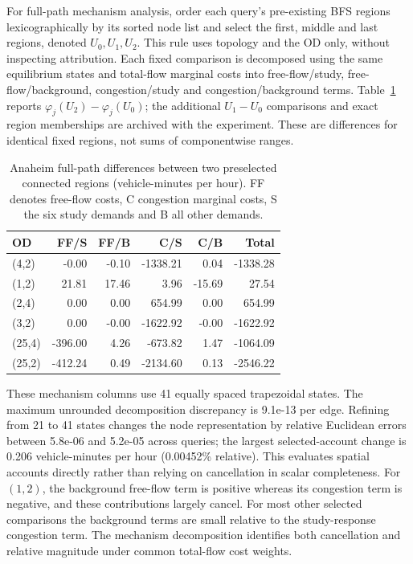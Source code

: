 For full-path mechanism analysis, order each query's pre-existing BFS regions lexicographically by its sorted node list and select the first, middle and last regions, denoted $U_0,U_1,U_2$. This rule uses topology and the OD only, without inspecting attribution. Each fixed comparison is decomposed using the same equilibrium states and total-flow marginal costs into free-flow/study, free-flow/background, congestion/study and congestion/background terms. Table~\ref{tab:anaheimmechanism} reports $\varphi_j(U_2)-\varphi_j(U_0)$; the additional $U_1-U_0$ comparisons and exact region memberships are archived with the experiment. These are differences for identical fixed regions, not sums of componentwise ranges.
\begin{table}[t]\centering\small
\caption{Anaheim full-path differences between two preselected connected regions (vehicle-minutes per hour). FF denotes free-flow costs, C congestion marginal costs, S the six study demands and B all other demands.}\label{tab:anaheimmechanism}
\begin{tabular}{lrrrrr}\toprule OD & FF/S & FF/B & C/S & C/B & Total\\\midrule
(4,2) & -0.00 & -0.10 & -1338.21 & 0.04 & -1338.28\\
(1,2) & 21.81 & 17.46 & 3.96 & -15.69 & 27.54\\
(2,4) & 0.00 & 0.00 & 654.99 & 0.00 & 654.99\\
(3,2) & 0.00 & -0.00 & -1622.92 & -0.00 & -1622.92\\
(25,4) & -396.00 & 4.26 & -673.82 & 1.47 & -1064.09\\
(25,2) & -412.24 & 0.49 & -2134.60 & 0.13 & -2546.22\\
\bottomrule\end{tabular}\end{table}
These mechanism columns use 41 equally spaced trapezoidal states. The maximum unrounded decomposition discrepancy is 9.1e-13 per edge. Refining from 21 to 41 states changes the node representation by relative Euclidean errors between 5.8e-06 and 5.2e-05 across queries; the largest selected-account change is 0.206 vehicle-minutes per hour (0.00452\% relative). This evaluates spatial accounts directly rather than relying on cancellation in scalar completeness. For $(1,2)$, the background free-flow term is positive whereas its congestion term is negative, and these contributions largely cancel. For most other selected comparisons the background terms are small relative to the study-response congestion term. The mechanism decomposition identifies both cancellation and relative magnitude under common total-flow cost weights.
